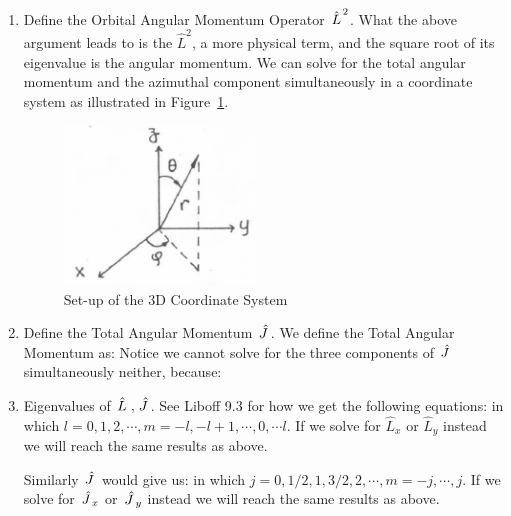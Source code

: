 \documentclass{school-22.101-notes}
\begin{document}
\begin{enumerate}
\item Define the Orbital Angular Momentum Operator $\left. \hat{L} \right.^2$. 
What the above argument leads to is the $\hat{L}^2$,  a more physical term, and the square root of its eigenvalue is the angular momentum. 
We can solve for the total angular momentum and the azimuthal component simultaneously in a coordinate system as illustrated in Figure~\ref{3DCS}. 
\begin{figure}
    \centering
    \includegraphics[width=2in]{images/qm/3DCS.png}
    \caption{Set-up of the 3D Coordinate System\label{3DCS}}
\end{figure}

\item Define the Total Angular Momentum $\left. \hat{J} \right.$. 
We define the Total Angular Momentum as:
\eqn{ \Jhat = \Lhat + \Shat }
Notice we cannot solve for the three components of $\left. \hat{J} \right.$ simultaneously neither, because: 


\item Eigenvalues of $\left. \hat{L} \right., \left. \hat{J} \right.$. 
See Liboff 9.3 for how we get the following equations: 
in which $l = 0,1,2, \cdots, m = -l, -l+1, \cdots, 0, \cdots l$. If we solve for $\hat{L}_x$ or $\hat{L}_y$ instead we will reach the same results as above. 

Similarly $\left. \hat{J} \right.$ would give us:
in which $j = 0,1/2,1,3/2,2, \cdots, m = -j, \cdots, j$. If we solve for $\left. \hat{J} \right._x$ or $\left. \hat{J} \right._y$ instead we will reach the same results as above. 


\end{enumerate}
\end{document}

